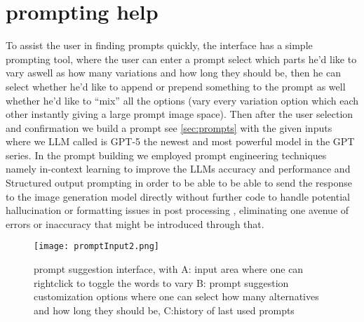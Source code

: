 \documentclass[
  a4paper,  %
  twoside,  %
  bibliography=totoc,
  headsepline,
  cleardoublepage=empty,
  parskip=half,
  draft=false
]{scrbook}
\begin{document}
\section{prompting help}
To assist the user in finding prompts quickly, the interface has a simple prompting tool, where the user can enter a prompt select which parts he'd like to vary aswell as how many variations and how long they should be, then he can select whether he'd like to append or prepend something to the prompt as well whether he'd like to \enquote{mix} all the options (vary every variation option which each other instantly giving a large prompt image space). Then after the user selection and confirmation we build a prompt see \autoref{sec:prompts} with the given inputs where we  LLM called is GPT-5 the newest and most powerful model in the GPT series. In the prompt building we employed prompt engineering techniques namely in-context learning to improve the LLMs accuracy and performance and Structured output prompting in order to be able to be able to send the response to the image generation model directly without further code to handle potential hallucination or formatting issues in post processing \cite{LLMoutputconstraints}, eliminating one avenue of errors or inaccuracy that might be introduced through that. 
\begin{figure}[H]
	\centering
	\texttt{[image: promptInput2.png]}
	\caption{prompt suggestion interface, with A: input area where one can rightclick to toggle the words to vary B: prompt suggestion customization options where one can select how many alternatives and how long they should be, C:history of last used prompts}
	\label{fig:promptInput}
\end{figure}
\end{document}

